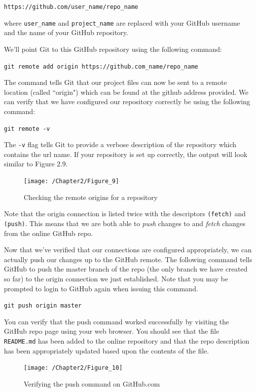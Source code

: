 \documentclass{book}
\begin{document}
\texttt{https://github.com/user\_name/repo\_name}

where \texttt{user\_name} and \texttt{project\_name} are replaced with your GitHub username and the name of your GitHub repository.

We'll point Git to this GitHub repository using the following command:

\texttt{git remote add origin https://github.com\_name/repo\_name}

The command tells Git that our project files can now be sent to a remote location (called ``origin") which can be found at the github address provided. We can verify that we have configured our repository correctly be using the following command:

\texttt{git remote -v}

The \texttt{-v} flag tells Git to provide a verbose description of the repository which contains the url name. If your repository is set up correctly, the output will look similar to Figure 2.9.

\begin{figure}[h]
	\caption{Checking the remote origins for a repository}
	\centering\texttt{[image: /Chapter2/Figure\_9]}
\end{figure}

Note that the origin connection is listed twice with the descriptors \texttt{(fetch)} and \texttt{(push)}. This means that we are both able to \textit{push} changes to and \textit{fetch} changes from the online GitHub repo.

Now that we've verified that our connections are configured appropriately, we can actually push our changes up to the GitHub remote. The following command tells GitHub to push the master branch of the repo (the only branch we have created so far) to the origin connection we just established. Note that you may be prompted to login to GitHub again when issuing this command.

\texttt{git push origin master}

You can verify that the push command worked successfully by visiting the GitHub repo page using your web browser. You should see that the file \texttt{README.md} has been added to the online repository and that the repo description has been appropriately updated based upon the contents of the file.

\begin{figure}[h]
	\caption{Verifying the push command on GitHub.com}
	\centering\texttt{[image: /Chapter2/Figure\_10]}
\end{figure}
\end{document}
